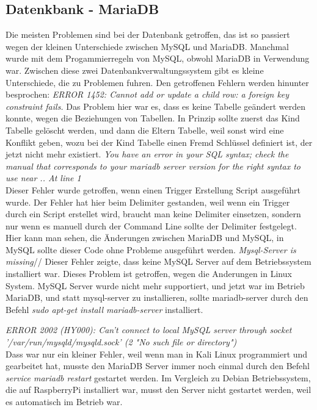 \subsection{Datenkbank - MariaDB}
Die meisten Problemen sind bei der Datenbank getroffen, das ist so passiert wegen der kleinen Unterschiede zwischen MySQL und MariaDB. Manchmal wurde mit dem Progammierregeln von MySQL, obwohl MariaDB in Verwendung war. Zwischen diese zwei Datenbankverwaltungssystem gibt es kleine Unterschiede, die zu Problemen fuhren. Den getroffenen Fehlern werden hinunter besprochen:
\bigbreak
\textit{ERROR 1452: Cannot add or update a child row: a foreign key constraint fails.}
Das Problem hier war es, dass es keine Tabelle geändert werden konnte, wegen die Beziehungen von Tabellen. In Prinzip sollte zuerst das Kind Tabelle gelöscht werden, und dann die Eltern Tabelle, weil sonst wird eine Konflikt geben, wozu bei der Kind Tabelle einen Fremd Schlüssel definiert ist, der jetzt nicht mehr existiert.
\bigbreak
\textit{You have an error in your SQL syntax; check the manual that corresponds to your mariadb server version for the right syntax to use near .. At line 1}\\
Dieser Fehler wurde getroffen, wenn einen Trigger Erstellung Script ausgeführt wurde. Der Fehler hat hier beim Delimiter gestanden, weil wenn ein Trigger durch ein Script erstellet wird, braucht man keine Delimiter einsetzen, sondern nur wenn es manuell durch der Command Line sollte der Delimiter festgelegt. Hier kann man sehen, die Änderungen zwischen MariaDB und MySQL, in MySQL sollte dieser Code ohne Probleme ausgeführt werden.
\bigbreak
\textit{Mysql-Server is missing}//
Dieser Fehler zeigte, dass keine MySQL Server auf dem Betriebssystem installiert war. Dieses Problem ist getroffen, wegen die Anderungen in Linux System. MySQL Server wurde nicht mehr supportiert, und jetzt war im Betrieb MariaDB, und statt mysql-server zu installieren, sollte mariadb-server durch den Befehl \textit{sudo apt-get install mariadb-server} installiert.

\bigbreak
\textit{ERROR 2002 (HY000): Can't connect to local MySQL server through socket \\'/var/run/mysqld/mysqld.sock' (2 "No such file or directory")}\\
Dass war nur ein kleiner Fehler, weil wenn man in Kali Linux programmiert und gearbeitet hat, musste den MariaDB Server immer noch einmal durch den Befehl \\ \textit{service mariadb restart} gestartet werden. Im Vergleich zu Debian Betriebssystem, die auf RaspberryPi installiert war, musst den Server nicht gestartet werden, weil es automatisch im Betrieb war.
